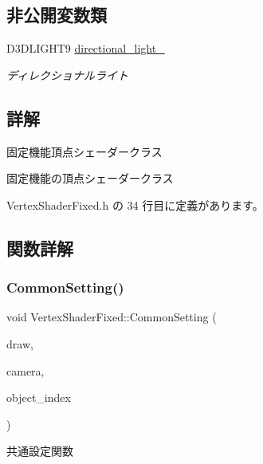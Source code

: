 \subsection*{非公開変数類}
\begin{DoxyCompactItemize}
\item 
D3\+D\+L\+I\+G\+H\+T9 \mbox{\hyperlink{class_vertex_shader_fixed_ae2409965de90816f89ba8797880b3cd2}{directional\+\_\+light\+\_\+}}
\begin{DoxyCompactList}\small\item\em ディレクショナルライト \end{DoxyCompactList}\end{DoxyCompactItemize}


\subsection{詳解}
固定機能頂点シェーダークラス 

固定機能の頂点シェーダークラス 

 Vertex\+Shader\+Fixed.\+h の 34 行目に定義があります。



\subsection{関数詳解}
\mbox{\label{class_vertex_shader_fixed_a82bf2829b6fd0df26faedcbf650ba08d}} 
\subsubsection{\texorpdfstring{Common\+Setting()}{CommonSetting()}}
{\footnotesize\ttfamily void Vertex\+Shader\+Fixed\+::\+Common\+Setting (\begin{DoxyParamCaption}\item[{\mbox{\hyperlink{class_draw_base}{Draw\+Base}} $\ast$}]{draw,  }\item[{\mbox{\hyperlink{class_camera}{Camera}} $\ast$}]{camera,  }\item[{unsigned}]{object\+\_\+index }\end{DoxyParamCaption})\hspace{0.3cm}{\ttfamily [virtual]}}



共通設定関数 


